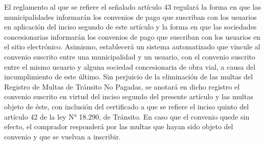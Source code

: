     El reglamento al que se refiere el señalado artículo 43 regulará la forma en que las municipalidades informarán los convenios de pago que suscriban con los usuarios en aplicación del inciso segundo de este artículo y la forma en que las sociedades concesionarias informarán los convenios de pago que suscriban con los usuarios en el sitio electrónico. Asimismo, establecerá un sistema automatizado que vincule al convenio suscrito entre una municipalidad y un usuario, con el convenio suscrito entre el mismo usuario y alguna sociedad concesionaria de obra vial, a causa del incumplimiento de este último.
    Sin perjuicio de la eliminación de las multas del Registro de Multas de Tránsito No Pagadas, se anotará en dicho registro el convenio suscrito en virtud del inciso segundo del presente artículo y las multas objeto de éste, con inclusión del certificado a que se refiere el inciso quinto del artículo 42 de la ley N° 18.290, de Tránsito. En caso que el convenio quede sin efecto, el comprador responderá por las multas que hayan sido objeto del convenio y que se vuelvan a inscribir.


